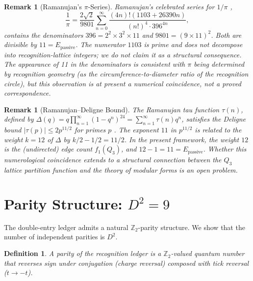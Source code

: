 \documentclass[11pt]{article}
\newtheorem{definition}[theorem]{Definition}
\newtheorem{remark}[theorem]{Remark}
\newcommand{\Z}{\mathbb{Z}}
\begin{document}
\begin{remark}[Ramanujan's $\pi$-Series]\label{rem:ramanujan_pi}
Ramanujan's celebrated series for $1/\pi$ \cite{Ramanujan1914},
\[
\frac{1}{\pi} = \frac{2\sqrt{2}}{9801} \sum_{n=0}^{\infty} \frac{(4n)!(1103 + 26390n)}{(n!)^4 \cdot 396^{4n}},
\]
contains the denominators $396 = 2^2 \times 3^2 \times 11$ and $9801 = (9 \times 11)^2$.
Both are divisible by $11 = E_{\mathrm{passive}}$.
The numerator $1103$ is prime and does not decompose into recognition-lattice integers; we do not claim it as a structural consequence.
The appearance of 11 in the \emph{denominators} is consistent with $\pi$ being determined by recognition geometry (as the circumference-to-diameter ratio of the recognition circle), but this observation is at present a numerical coincidence, not a proved correspondence.
\end{remark}

\begin{remark}[Ramanujan--Deligne Bound]\label{rem:ramanujan_deligne}
The Ramanujan tau function $\tau(n)$, defined by $\Delta(q) = q \prod_{n=1}^{\infty}(1-q^n)^{24} = \sum_{n=1}^{\infty} \tau(n) q^n$, satisfies the Deligne bound $|\tau(p)| \le 2p^{11/2}$ for primes $p$ \cite{Deligne1974}.
The exponent $11$ in $p^{11/2}$ is related to the weight $k = 12$ of $\Delta$ by $k/2 - 1/2 = 11/2$.
In the present framework, the weight $12$ is the (undirected) edge count $f_1(Q_3)$, and $12 - 1 = 11 = E_{\mathrm{passive}}$.
Whether this numerological coincidence extends to a structural connection between the $Q_3$ lattice partition function and the theory of modular forms is an open problem.
\end{remark}

\section{Parity Structure: $D^2 = 9$}
\label{sec:parities}

The double-entry ledger admits a natural $\Z_2$-parity structure.
We show that the number of independent parities is $D^2$.

\begin{definition}\label{def:parities}
A \emph{parity} of the recognition ledger is a $\Z_2$-valued quantum number that reverses sign under conjugation (charge reversal) composed with tick reversal ($t \to -t$).
\end{definition}
\end{document}
